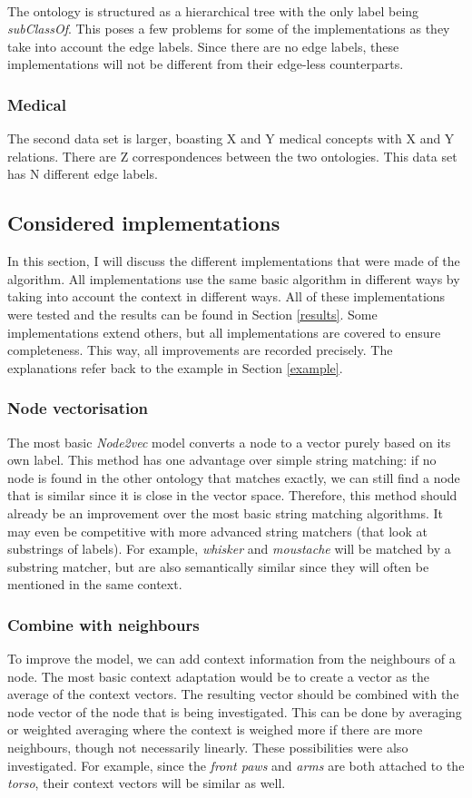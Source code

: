 \documentclass{article}
\begin{document}
 \paragraph{}
 The ontology is structured as a hierarchical tree with the only label being \emph{subClassOf}. This poses a few problems for some of the implementations as they take into account the edge labels. Since there are no edge labels, these implementations will not be different from their edge-less counterparts.
 \subsubsection{Medical}
 The second data set is larger, boasting X and Y medical concepts with X and Y relations. There are Z correspondences between the two ontologies. This data set has N different edge labels.
 
 \subsection{Considered implementations}
 In this section, I will discuss the different implementations that were made of the algorithm. All implementations use the same basic algorithm in different ways by taking into account the context in different ways. All of these implementations were tested and the results can be found in Section \ref{results}. Some implementations extend others, but all implementations are covered to ensure completeness. This way, all improvements are recorded precisely.
 The explanations refer back to the example in Section \ref{example}.
  \subsubsection{Node vectorisation}
  The most basic \emph{Node2vec} model converts a node to a vector purely based on its own label. This method has one advantage over simple string matching: if no node is found in the other ontology that matches exactly, we can still find a node that is similar since it is close in the vector space. Therefore, this method should already be an improvement over the most basic string matching algorithms. It may even be competitive with more advanced string matchers (that look at substrings of labels). For example, \emph{whisker} and \emph{moustache} will be matched by a substring matcher, but are also semantically similar since they will often be mentioned in the same context.
  \subsubsection{Combine with neighbours}
  To improve the model, we can add context information from the neighbours of a node. The most basic context adaptation would be to create a vector as the average of the context vectors. The resulting vector should be combined with the node vector of the node that is being investigated. This can be done by averaging or weighted averaging where the context is weighed more if there are more neighbours, though not necessarily linearly. These possibilities were also investigated.
  For example, since the \emph{front paws} and \emph{arms} are both attached to the \emph{torso}, their context vectors will be similar as well.
\end{document}
